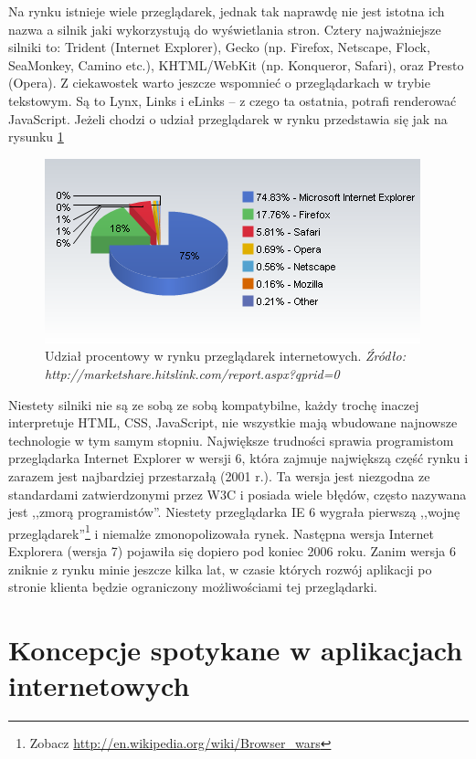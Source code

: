 \documentclass[a4paper,12pt,oneside]{report}
\begin{document}
Na rynku istnieje wiele przeglądarek, jednak tak naprawdę nie jest istotna ich nazwa a silnik jaki wykorzystują do wyświetlania stron. Cztery najważniejsze silniki to: Trident (Internet Explorer), Gecko (np. Firefox, Netscape, Flock, SeaMonkey, Camino etc.), KHTML/WebKit (np. Konqueror, Safari), oraz Presto (Opera). Z ciekawostek warto jeszcze wspomnieć o przeglądarkach w trybie tekstowym. Są to Lynx, Links i eLinks -- z czego ta ostatnia, potrafi renderować JavaScript. Jeżeli chodzi o udział przeglądarek w rynku przedstawia się jak na rysunku \ref{fig:przegladarki}
\begin{figure}[h]
\centering
  \includegraphics{browsers.png}
  \caption{
  Udział procentowy w rynku przeglądarek internetowych.\newline
  \emph{Źródło: http://marketshare.hitslink.com/report.aspx?qprid=0}
  \label{fig:przegladarki}
  }
\end{figure}

Niestety silniki nie są ze sobą ze sobą kompatybilne, każdy trochę inaczej interpretuje HTML, CSS, JavaScript, nie wszystkie mają wbudowane najnowsze technologie w tym samym stopniu. Największe trudności sprawia programistom przeglądarka Internet Explorer w wersji 6, która zajmuje największą część rynku i zarazem jest najbardziej przestarzałą (2001 r.). Ta wersja jest niezgodna ze standardami zatwierdzonymi przez W3C i posiada wiele błędów, często nazywana jest ,,zmorą programistów''. Niestety przeglądarka IE 6 wygrała pierwszą ,,wojnę przeglądarek''\footnote{Zobacz \url{http://en.wikipedia.org/wiki/Browser_wars}} i niemalże zmonopolizowała rynek. Następna wersja Internet Explorera (wersja 7) pojawiła się dopiero pod koniec 2006 roku. Zanim wersja 6 zniknie z rynku minie jeszcze kilka lat, w czasie których rozwój aplikacji po stronie klienta będzie ograniczony możliwościami tej przeglądarki.

\chapter[Rozwiązania koncepcyjne]{Koncepcje spotykane w aplikacjach internetowych}
\label{cha:koncepcje}
\end{document}
